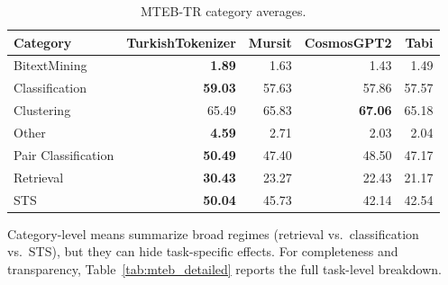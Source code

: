 \begin{table}[H]
\centering
\caption{MTEB-TR category averages.}
\label{tab:mteb_category_averages}
\begin{tabular}{lrrrr}
\toprule
\textbf{Category} & \textbf{TurkishTokenizer} & \textbf{Mursit} & \textbf{CosmosGPT2} & \textbf{Tabi} \\
\midrule
BitextMining & \textbf{1.89} & 1.63 & 1.43 & 1.49 \\
Classification & \textbf{59.03} & 57.63 & 57.86 & 57.57 \\
Clustering & 65.49 & 65.83 & \textbf{67.06} & 65.18 \\
Other & \textbf{4.59} & 2.71 & 2.03 & 2.04 \\
Pair Classification & \textbf{50.49} & 47.40 & 48.50 & 47.17 \\
Retrieval & \textbf{30.43} & 23.27 & 22.43 & 21.17 \\
STS & \textbf{50.04} & 45.73 & 42.14 & 42.54 \\
\bottomrule
\end{tabular}
\end{table}

Category-level means summarize broad regimes (retrieval vs.\ classification vs.\ STS), but they can hide task-specific effects. For completeness and transparency, Table~\ref{tab:mteb_detailed} reports the full task-level breakdown.

